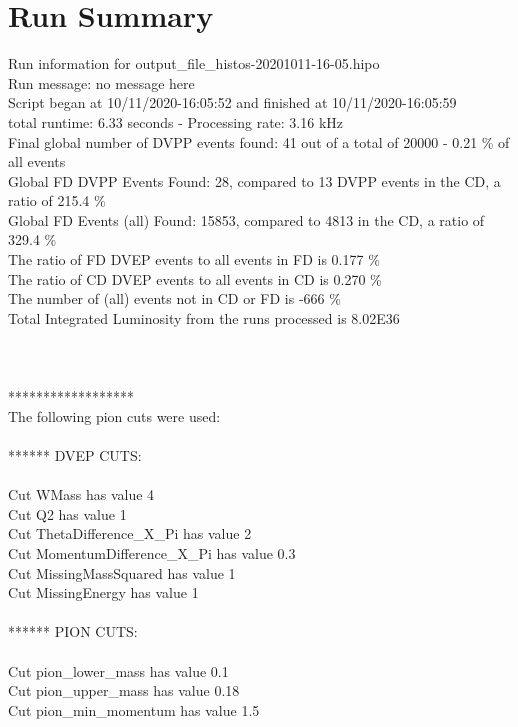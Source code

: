 \documentclass{article}
\begin{document}
\section{Run Summary}

	Run information for output\_file\_histos-20201011-16-05.hipo 
\\Run message: no message here  
\\Script began at 10/11/2020-16:05:52 and finished at 10/11/2020-16:05:59
\\total runtime: 6.33 seconds - Processing rate: 3.16 kHz 
\\Final global number of DVPP events found: 41 out of a total of 20000 - 0.21 \% of all events
\\Global FD DVPP Events Found: 28, compared to 13 DVPP events in the CD, a ratio of 215.4 \%
\\Global FD Events (all) Found: 15853, compared to 4813 in the CD, a ratio of 329.4 \%
\\The ratio of FD DVEP events to all events in FD is  0.177 \%
\\The ratio of CD DVEP events to all events in CD is  0.270 \%
\\The number of (all) events not in CD or FD is  -666 \%
\\Total Integrated Luminosity from the runs processed is 8.02E36 
\\
\\ 
\\
\\****************** 
\\ The following pion cuts were used: 
\\
\\ ****** DVEP CUTS: 
\\ 
\\Cut WMass has value 4 
\\Cut Q2 has value 1 
\\Cut ThetaDifference\_X\_Pi has value 2 
\\Cut MomentumDifference\_X\_Pi has value 0.3 
\\Cut MissingMassSquared has value 1 
\\Cut MissingEnergy has value 1 
\\
\\ ****** PION CUTS: 
\\ 
\\Cut pion\_lower\_mass has value 0.1 
\\Cut pion\_upper\_mass has value 0.18 
\\Cut pion\_min\_momentum has value 1.5 
\end{document}
